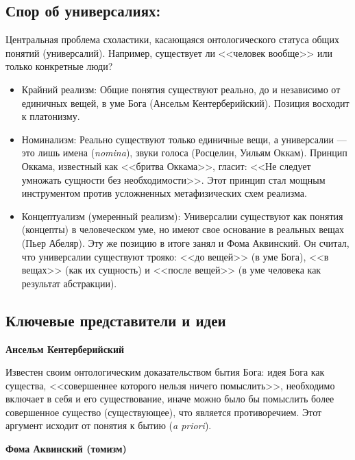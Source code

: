 \documentclass[12pt,a4paper]{article}
\begin{document}
	\subsection{Спор об универсалиях:}
	Центральная проблема схоластики, касающаяся онтологического статуса общих понятий (универсалий). Например, существует ли <<человек вообще>> или только конкретные люди?
	\begin{itemize}
		\item Крайний реализм: Общие понятия существуют реально, до и независимо от единичных вещей, в уме Бога (Ансельм Кентерберийский). Позиция восходит к платонизму.
		\item Номинализм: Реально существуют только единичные вещи, а универсалии — это лишь имена (\textit{nomina}), звуки голоса (Росцелин, Уильям Оккам). Принцип Оккама, известный как <<бритва Оккама>>, гласит: <<Не следует умножать сущности без необходимости>>. Этот принцип стал мощным инструментом против усложненных метафизических схем реализма.
		\item Концептуализм (умеренный реализм): Универсалии существуют как понятия (концепты) в человеческом уме, но имеют свое основание в реальных вещах (Пьер Абеляр). Эту же позицию в итоге занял и Фома Аквинский. Он считал, что универсалии существуют трояко: <<до вещей>> (в уме Бога), <<в вещах>> (как их сущность) и <<после вещей>> (в уме человека как результат абстракции).
	\end{itemize}
	
	\subsection{Ключевые представители и идеи}
	\textbf{Ансельм Кентерберийский}
	
	Известен своим онтологическим доказательством бытия Бога: идея Бога как существа, <<совершеннее которого нельзя ничего помыслить>>, необходимо включает в себя и его существование, иначе можно было бы помыслить более совершенное существо (существующее), что является противоречием. Этот аргумент исходит от понятия к бытию (\textit{a priori}).
	
	\textbf{Фома Аквинский (томизм)}
	
\end{document}
